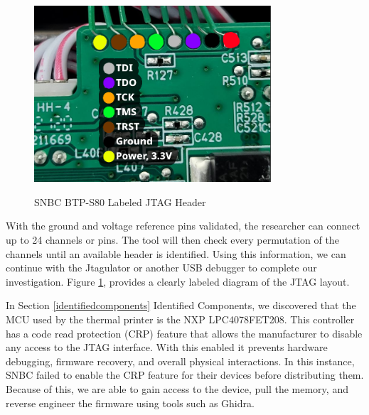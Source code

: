 \begin{figure}[ht]
    \centering
    {\includegraphics[width=88mm,scale=0.5]
    {Figures/Teardown/JTAG_annotated.png}}
    \caption{SNBC BTP-S80 Labeled JTAG Header}
    \label{fig:snbc_btp_s80_jtag_header}
\end{figure}

With the ground and voltage reference pins validated, the researcher can connect up to 24 channels or pins. The tool will then check every permutation of the channels until an available header is identified. Using this information, we can continue with the Jtagulator or another USB debugger to complete our investigation. Figure \ref{fig:snbc_btp_s80_jtag_header}, provides a clearly labeled diagram of the JTAG layout.

In Section \ref{identifiedcomponents} Identified Components, we discovered that the MCU used by the thermal printer is the NXP LPC4078FET208. This controller has a code read protection (CRP) feature that allows the manufacturer to disable any access to the JTAG interface. With this enabled it prevents hardware debugging, firmware recovery, and overall physical interactions. In this instance, SNBC failed to enable the CRP feature for their devices before distributing them. Because of this, we are able to gain access to the device, pull the memory, and reverse engineer the firmware using tools such as Ghidra.